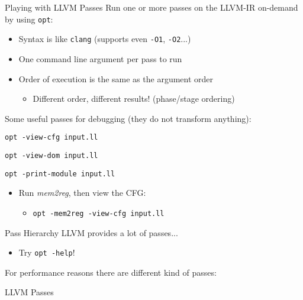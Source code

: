 \begin{frame}{Playing with LLVM Passes}
Run one or more passes on the LLVM-IR on-demand by using \texttt{opt}:

\begin{itemize}
\item Syntax is like \texttt{clang} (supports even \texttt{-O1}, \texttt{-O2}...)
\item One command line argument per pass to run
\item Order of execution is the same as the argument order
\begin{itemize}
\item Different order, different results! (\alert{phase/stage ordering})
\end{itemize}
\end{itemize}

\vfill
Some useful passes for debugging (they do not transform anything):

{\small
\begin{description}
\item[print CFG] \texttt{opt -view-cfg input.ll}
\item[print dominator tree] \texttt{opt -view-dom input.ll}
\item[print current IR] \texttt{opt -print-module input.ll}
\end{description}
}

\vfill
\begin{example}
\begin{itemize}
\item Run \emph{mem2reg}, then view the CFG:
\begin{itemize}
\item \texttt{opt -mem2reg -view-cfg input.ll}
\end{itemize}
\end{itemize}
\end{example}
\end{frame}


\begin{frame}{Pass Hierarchy}
LLVM provides a lot of passes...

\begin{itemize}
\item Try \texttt{opt -help}!
\end{itemize}

\vfill
For performance reasons there are different kind of passes:

\begin{block}{LLVM Passes}

\centering
\end{block}
\end{frame}


